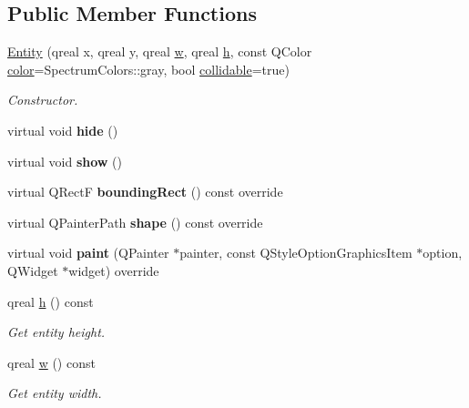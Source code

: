 \subsection*{Public Member Functions}
\begin{DoxyCompactItemize}
\item 
\hyperlink{class_entity_a8bd147aa4f7a0ae97559fb71fb5a3504}{Entity} (qreal x, qreal y, qreal \hyperlink{class_entity_a351a26475f8c124429a638483e95fa8e}{w}, qreal \hyperlink{class_entity_a639fea375adab80851778acb51757fb8}{h}, const Q\+Color \hyperlink{class_entity_ad14bf88ca550e2e5b13438a3faf545e6}{color}=Spectrum\+Colors\+::gray, bool \hyperlink{class_entity_a0d21d9ca00bc81494aec120c0840c191}{collidable}=true)
\begin{DoxyCompactList}\small\item\em Constructor. \end{DoxyCompactList}\item 
\mbox{\label{class_entity_a752393fb51ee62c4b4183231e05b3343}} 
virtual void {\bfseries hide} ()
\item 
\mbox{\label{class_entity_a111d61c668ae3b78d88b60c82db8ee00}} 
virtual void {\bfseries show} ()
\item 
\mbox{\label{class_entity_a3e8eb5a48e47e8d690c0e7639ee13ebb}} 
virtual Q\+RectF {\bfseries bounding\+Rect} () const override
\item 
\mbox{\label{class_entity_abf7481503e83a98eed7ec345a0b09300}} 
virtual Q\+Painter\+Path {\bfseries shape} () const override
\item 
\mbox{\label{class_entity_a4332b509c01fd3fbe500fe183c9d18d7}} 
virtual void {\bfseries paint} (Q\+Painter $\ast$painter, const Q\+Style\+Option\+Graphics\+Item $\ast$option, Q\+Widget $\ast$widget) override
\item 
qreal \hyperlink{class_entity_a639fea375adab80851778acb51757fb8}{h} () const
\begin{DoxyCompactList}\small\item\em Get entity height. \end{DoxyCompactList}\item 
qreal \hyperlink{class_entity_a351a26475f8c124429a638483e95fa8e}{w} () const
\begin{DoxyCompactList}\small\item\em Get entity width. \end{DoxyCompactList}\item 

\end{DoxyCompactItemize}

